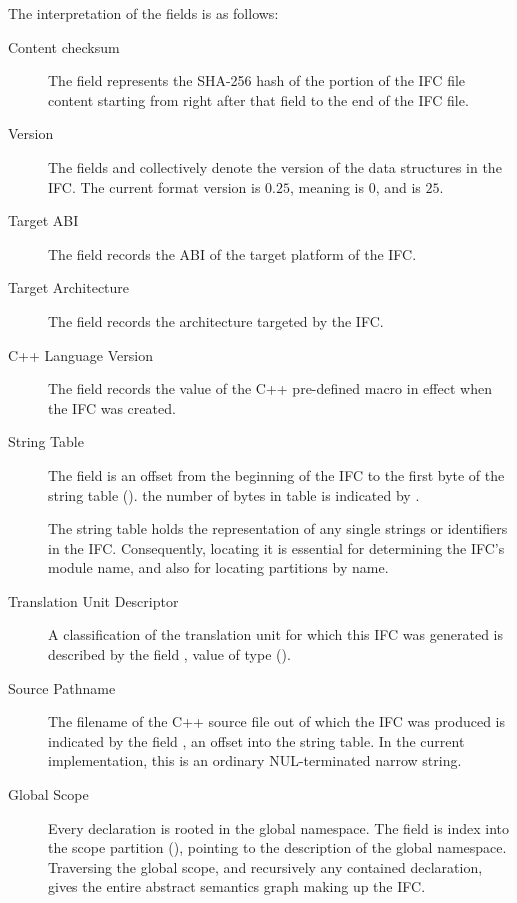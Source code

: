 The interpretation of the fields is as follows:
\begin{description}
\item[Content checksum]
	The field  represents the SHA-256 hash of the portion of the IFC file content starting from right after 
	that field to the end of the IFC file.

\item[Version]
	The fields  and  collectively denote the version of the data structures in the
	IFC. The current format version is $0.25$, meaning  is $0$,
	and  is $25$.

\item[Target ABI] 
	The field  records the ABI of the target platform of the IFC.

\item[Target Architecture]
	The field  records the architecture targeted by the IFC.

\item[C++ Language Version]
	The field  records the value of the C++ pre-defined macro  in effect
	when the IFC was created.

\item[String Table]
	The field  is an offset from the beginning of the IFC to the first byte of the string table ().
	the number of bytes in table is indicated by .

	The string table holds the representation of any single strings or identifiers in the IFC.  Consequently, locating it is
	essential for determining the IFC's module name, and also for locating partitions by name.

\item[Translation Unit Descriptor]
	A classification of the translation unit for which this IFC was generated is described by the field ,  value of
     type  ().

\item[Source Pathname]
	The filename of the C++ source file out of which the IFC was produced is indicated by the field , an
	offset into the string table.  In the current implementation, this is an ordinary NUL-terminated narrow string.

\item[Global Scope]
	Every declaration is rooted in the global namespace.  The field  is index into the
	scope partition (), pointing to the description of the global namespace.  Traversing the global scope, and recursively any 
	contained declaration, gives the entire abstract semantics graph making up the IFC.


\end{description}
